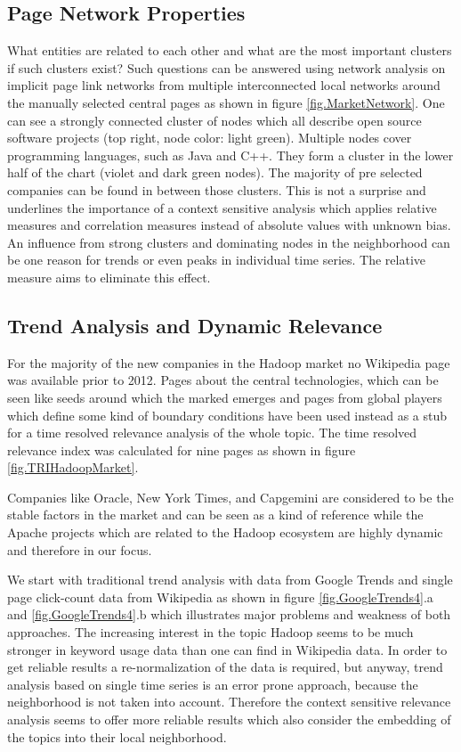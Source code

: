 \documentclass[a4paper,10pt]{scrbook}
\begin{document}
\subsection{Page Network Properties}
What entities are related to each other and what are the most important clusters if such clusters exist? Such questions can be answered using network analysis on implicit page link networks from multiple interconnected local networks around the manually selected central pages as shown in figure \ref{fig.MarketNetwork}. One can see a strongly connected cluster of nodes which all describe open source software projects (top right, node color: light green). Multiple nodes cover programming languages, such as Java and C++. They form a cluster in the lower half of the chart (violet and dark green nodes). The majority of pre selected companies can be found in between those clusters. This is not a surprise and underlines the importance of a context sensitive analysis which applies relative measures and correlation measures instead of absolute values with unknown bias. An influence from strong clusters and dominating nodes in the neighborhood can be one reason for trends or even peaks in individual time series. The relative measure aims to eliminate this effect. 

\label{ext.fig.MarketNetwork} 

 
\subsection{Trend Analysis and Dynamic Relevance}
For the majority of the new companies in the Hadoop market no Wikipedia page was available prior to 2012. Pages about the central technologies, which can be seen like seeds around which the marked emerges and pages from global players which define some kind of boundary conditions have been used instead as a stub for a time resolved relevance analysis of the whole topic. The time resolved relevance index was calculated for nine pages as shown in figure \ref{fig.TRIHadoopMarket}. 

Companies like Oracle, New York Times, and Capgemini are considered to be the stable factors in the market and can be seen as a kind of reference while the Apache projects which are related to the Hadoop ecosystem are highly dynamic and therefore in our focus. 

We start with traditional trend analysis with data from Google Trends and single page click-count data from Wikipedia as shown in figure \ref{fig.GoogleTrends4}.a and \ref{fig.GoogleTrends4}.b which illustrates major problems and weakness of both approaches. The increasing interest in the topic Hadoop seems to be much stronger in keyword usage data than one can find in Wikipedia data. In order to get reliable results a re-normalization of the data is required, but anyway, trend analysis based on single time series is an error prone approach, because the neighborhood is not taken into account. Therefore the context sensitive relevance analysis seems to offer more reliable results which also consider the embedding of the topics into their local neighborhood.
 
\end{document}
